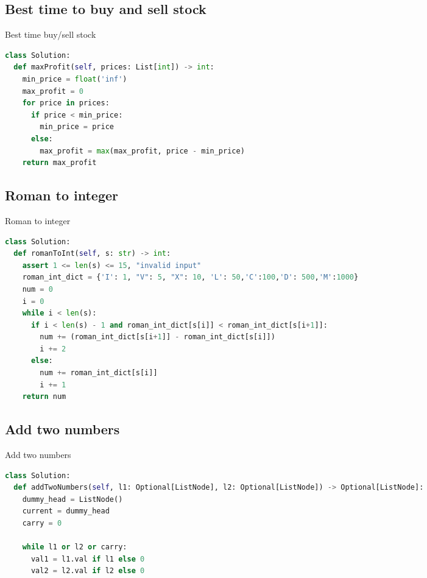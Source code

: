 \documentclass[a4paper,12pt]{article}
\begin{document}
\begin{multicols}{2}
\subsection{Best time to buy and sell stock}

\begin{mycode}[label={lst:best-time-buy-sell-stock}]{Best time buy/sell stock}
\begin{lstlisting}[language=Python]
class Solution:
  def maxProfit(self, prices: List[int]) -> int:
    min_price = float('inf')
    max_profit = 0
    for price in prices:
      if price < min_price:
        min_price = price
      else:
        max_profit = max(max_profit, price - min_price)
    return max_profit
\end{lstlisting}
\end{mycode}



\subsection{Roman to integer}

\begin{mycode}[label={lst:roman-to-integer}]{Roman to integer}
\begin{lstlisting}[language=Python]
class Solution:
  def romanToInt(self, s: str) -> int:
    assert 1 <= len(s) <= 15, "invalid input"
    roman_int_dict = {'I': 1, "V": 5, "X": 10, 'L': 50,'C':100,'D': 500,'M':1000}
    num = 0
    i = 0
    while i < len(s):
      if i < len(s) - 1 and roman_int_dict[s[i]] < roman_int_dict[s[i+1]]:
        num += (roman_int_dict[s[i+1]] - roman_int_dict[s[i]])
        i += 2
      else:
        num += roman_int_dict[s[i]]
        i += 1
    return num
\end{lstlisting}
\end{mycode}


\subsection{Add two numbers}

\begin{mycode}[label={lst:add-two-numbers}]{Add two numbers}
\begin{lstlisting}[language=Python]
class Solution:
  def addTwoNumbers(self, l1: Optional[ListNode], l2: Optional[ListNode]) -> Optional[ListNode]:
    dummy_head = ListNode()
    current = dummy_head
    carry = 0

    while l1 or l2 or carry:
      val1 = l1.val if l1 else 0
      val2 = l2.val if l2 else 0


\end{lstlisting}
\end{mycode}
\end{multicols}
\end{document}
